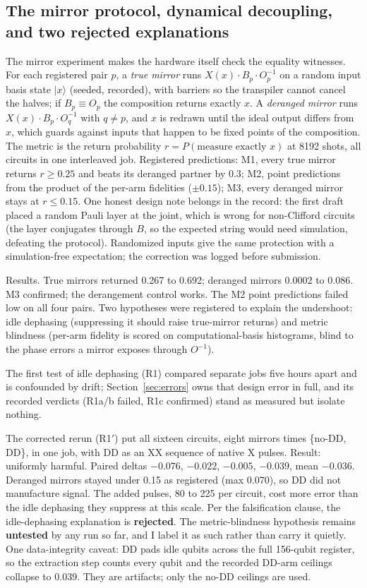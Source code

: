 \subsection{The mirror protocol, dynamical decoupling, and two rejected explanations}

The mirror experiment makes the hardware itself check the equality witnesses. For each registered pair $p$, a \emph{true mirror} runs $X(x)\cdot B_p \cdot O_p^{-1}$ on a random input basis state $|x\rangle$ (seeded, recorded), with barriers so the transpiler cannot cancel the halves; if $B_p \equiv O_p$ the composition returns exactly $x$. A \emph{deranged mirror} runs $X(x)\cdot B_p \cdot O_q^{-1}$ with $q \neq p$, and $x$ is redrawn until the ideal output differs from $x$, which guards against inputs that happen to be fixed points of the composition. The metric is the return probability $r = P(\text{measure exactly } x)$ at 8192 shots, all circuits in one interleaved job. Registered predictions: M1, every true mirror returns $r \geq 0.25$ and beats its deranged partner by 0.3; M2, point predictions from the product of the per-arm fidelities ($\pm 0.15$); M3, every deranged mirror stays at $r \leq 0.15$. One honest design note belongs in the record: the first draft placed a random Pauli layer at the joint, which is wrong for non-Clifford circuits (the layer conjugates through $B$, so the expected string would need simulation, defeating the protocol). Randomized inputs give the same protection with a simulation-free expectation; the correction was logged before submission.

Results. True mirrors returned 0.267 to 0.692; deranged mirrors 0.0002 to 0.086. M3 confirmed; the derangement control works. The M2 point predictions failed low on all four pairs. Two hypotheses were registered to explain the undershoot: idle dephasing (suppressing it should raise true-mirror returns) and metric blindness (per-arm fidelity is scored on computational-basis histograms, blind to the phase errors a mirror exposes through $O^{-1}$).

The first test of idle dephasing (R1) compared separate jobs five hours apart and is confounded by drift; Section~\ref{sec:errors} owns that design error in full, and its recorded verdicts (R1a/b failed, R1c confirmed) stand as measured but isolate nothing.

The corrected rerun (R1$'$) put all sixteen circuits, eight mirrors times \{no-DD, DD\}, in one job, with DD as an XX sequence of native X pulses. Result: uniformly harmful. Paired deltas $-0.076$, $-0.022$, $-0.005$, $-0.039$, mean $-0.036$. Deranged mirrors stayed under 0.15 as registered (max 0.070), so DD did not manufacture signal. The added pulses, 80 to 225 per circuit, cost more error than the idle dephasing they suppress at this scale. Per the falsification clause, the idle-dephasing explanation is \textbf{rejected}. The metric-blindness hypothesis remains \textbf{untested} by any run so far, and I label it as such rather than carry it quietly. One data-integrity caveat: DD pads idle qubits across the full 156-qubit register, so the extraction step counts every qubit and the recorded DD-arm ceilings collapse to 0.039. They are artifacts; only the no-DD ceilings are used.

